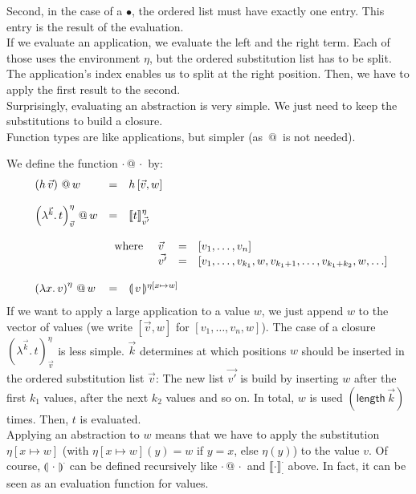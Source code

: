 \documentclass[12pt, a4paper, titlepage]{article}
\makeatletter
\newcommand{\ovar}{\mathord{\bullet}}
\newcommand{\sspace}{\,}
\newcommand{\la}{\lambda}
\newcommand{\ve}[1]{[#1]}
\newcommand{\emphSec}[1]{#1}
\newcommand{\ClosO}[4]{\left(\la^{#1} . \sspace {#2} \right)^{#3}_{#4}}
\newcommand{\AbsO}[3]{\left( \la {#1}. \sspace {#2} \right)^{#3}}
\newcommand{\pa}[1]{\left( #1 \right)}
\newcommand{\ev}[3]{\llbracket{#1}\rrbracket^{#2}_{#3}}
\newcommand{\ap}{\,@\,}
\newcommand{\valsub}[2]{\llparenthesis {\,#1\,} \rrparenthesis^{#2}}
\makeatother
\begin{document}
Second, in the case of a $\ovar$, the ordered list must have exactly one entry. This entry is the result of the evaluation. \\
If we evaluate an application, we evaluate the left and the right term. Each of those uses the environment $\eta$, but the ordered substitution list has to be split. The application's index enables us to split at the right position. Then, we have to apply the first result to the second. \\ 
Surprisingly, evaluating an abstraction is very simple. We just need to keep the substitutions to build a closure. \\
Function types are like applications, but simpler (as $\ap$ is not needed).

We define the function $\cdot \ap \cdot$ by: 
\[ 
\begin{array}{llll}
& \pa{h \sspace \vec v} \ap w & = & h \sspace \ve{\vec v, w} 
\\ \\
& \ClosO {\vec k} t {\eta}{\vec v}    \ap  w & = & \ev t \eta {\vec {v'}}  
\\ \\
&& 
\multicolumn 2 l{
\begin{array}{llcl}
\mbox{where } & \vec v & = & \ve{v_1, \ldots, v_n} \\
              & \vec {v'} & = & \ve{v_1, \ldots, v_{k_1}, w, v_{k_1+1}, \ldots, v_{k_1+k_2}, w, \ldots }
\end{array}
} \\ \\
& \AbsO x v \eta \ap w & = & \valsub{v}{\eta [x \mapsto w]}
\end{array}
\]
If we want to apply a \emphSec{large application} to a value $w$, we just append $w$ to the vector of values (we write $\ve{\vec v, w}$ for $\ve{v_1, \ldots, v_n, w}$). 
The case of a \emphSec{closure} $\ClosO {\vec k} t {\eta}{\vec v}$ is less simple. $\vec k$ determines at which positions $w$ should be inserted in the ordered substitution list $\vec v$: The new list $\vec {v'}$ is build by inserting $w$ after the first $k_1$ values, after the next $k_2$ values and so on. In total, $w$ is used $(\mathsf{length}\, \vec k)$ times. Then, $t$ is evaluated. \\
Applying an \emphSec{abstraction} to $w$ means that we have to apply the substitution $\eta [x \mapsto w]$ (with $\eta [x \mapsto w] (y) = w$ if $y = x$, else $\eta(y)$) to the value $v$. Of course, $\valsub \cdot \cdot$ can be defined recursively like $\cdot \ap \cdot$ and $\ev \cdot \cdot \cdot$ above. In fact, it can be seen as an evaluation function for values. \\
\end{document}
